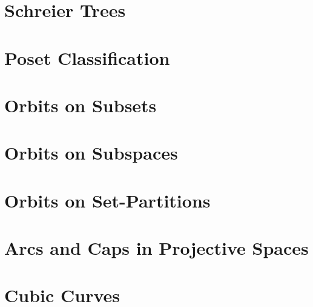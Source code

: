 

\section{Schreier Trees}
\label{sec:orbit:algorithms}



\bigskip


\clearpage



\section{Poset Classification}
\label{sec:posetclassification}







\clearpage


\section{Orbits on Subsets}
\label{sec:subsetorbits}






\bigskip

\clearpage

\section{Orbits on Subspaces}
\label{sec:subspaceorbits}



\bigskip

\clearpage






\clearpage

\section{Orbits on Set-Partitions}
\label{sec:orbits:setpartition}



\bigskip

\clearpage







\section{Arcs and Caps in Projective Spaces}
\label{sec:arcs}



 
\bigskip
\clearpage


\section{Cubic Curves}
\label{sec:cubiccurves}




\bigskip

\clearpage
